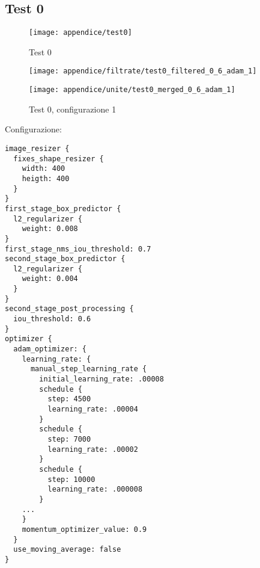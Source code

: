 \newpage
\subsection{Test 0}
\begin{figure}[!ht] 
    \centering
    \texttt{[image: appendice/test0]} 
    \caption{Test 0}
    \label{img:test-1}
\end{figure} 
\newpage



\begin{figure}[H]  
    \begin{minipage}{.5\columnwidth}  
        \centering  
        \texttt{[image: appendice/filtrate/test0\_filtered\_0\_6\_adam\_1]}  
    \end{minipage}%
    \begin{minipage}{0.5\columnwidth}  
        \centering  
        \texttt{[image: appendice/unite/test0\_merged\_0\_6\_adam\_1]}  
    \end{minipage}  
    \caption{Test 0, configurazione 1}
\end{figure}%
Configurazione:
\begin{multicols}{2}
    \begin{lstlisting}
image_resizer {
  fixes_shape_resizer {
    width: 400
    heigth: 400
  }
}
first_stage_box_predictor {
  l2_regularizer {
    weight: 0.008
}
first_stage_nms_iou_threshold: 0.7
second_stage_box_predictor {
  l2_regularizer {
    weight: 0.004
  }
}
second_stage_post_processing {
  iou_threshold: 0.6
}
optimizer {
  adam_optimizer: {
    learning_rate: {
      manual_step_learning_rate {
        initial_learning_rate: .00008
        schedule {
          step: 4500
          learning_rate: .00004
        }
        schedule {
          step: 7000
          learning_rate: .00002
        }
        schedule {
          step: 10000
          learning_rate: .000008
        }
    ...
    }
    momentum_optimizer_value: 0.9
  }
  use_moving_average: false
}
\end{lstlisting}
\end{multicols}

